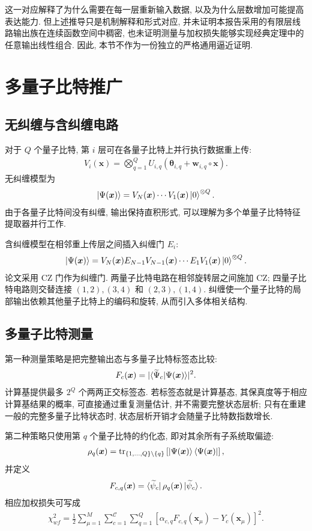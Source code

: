 \documentclass[a4paper]{ctexart}
\begin{document}
这一对应解释了为什么需要在每一层重新输入数据, 以及为什么层数增加可能提高表达能力. 但上述推导只是机制解释和形式对应, 并未证明本报告采用的有限层线路输出族在连续函数空间中稠密, 也未证明测量与加权损失能够实现经典定理中的任意输出线性组合. 因此, 本节不作为一份独立的严格通用逼近证明.

\section{多量子比特推广}

\subsection{无纠缠与含纠缠电路}

对于 $Q$ 个量子比特, 第 $i$ 层可在各量子比特上并行执行数据重上传:
\begin{align}
    V_i(\bm{x})=\bigotimes_{q=1}^Q U_{i, q}(\bm{\theta}_{i, q}+\bm{w}_{i, q}\circ\bm{x}).
\end{align}
无纠缠模型为
\begin{align}
    \ket{\Psi(\bm{x})}=V_N(\bm{x})\cdots V_1(\bm{x})\ket{0}^{\otimes Q}.
\end{align}
由于各量子比特间没有纠缠, 输出保持直积形式, 可以理解为多个单量子比特特征提取器并行工作.

含纠缠模型在相邻重上传层之间插入纠缠门 $E_i$:
\begin{align}
    \ket{\Psi(\bm{x})}=V_N(\bm{x})E_{N-1}V_{N-1}(\bm{x})\cdots E_1 V_1(\bm{x})\ket{0}^{\otimes Q}.
\end{align}
论文采用 CZ 门作为纠缠门. 两量子比特电路在相邻旋转层之间施加 CZ; 四量子比特电路则交替连接 $(1, 2),(3, 4)$ 和 $(2, 3),(1, 4)$. 纠缠使一个量子比特的局部输出依赖其他量子比特上的编码和旋转, 从而引入多体相关结构.

\subsection{多量子比特测量}

第一种测量策略是把完整输出态与多量子比特标签态比较:
\begin{align}
    F_c(\bm{x})=\lvert\braket{\widetilde{\Psi}_c|\Psi(\bm{x})}\rvert^2.
\end{align}
计算基提供最多 $2^Q$ 个两两正交标签态. 若标签态就是计算基态, 其保真度等于相应计算基结果的概率, 可直接通过重复测量估计, 并不需要完整状态层析; 只有在重建一般的完整多量子比特状态时, 状态层析开销才会随量子比特数指数增长.

第二种策略只使用第 $q$ 个量子比特的约化态, 即对其余所有子系统取偏迹:
\begin{align}
    \rho_q(\bm{x})=\operatorname{tr}_{\{1, \ldots, Q\}\setminus\{q\}}\left[\ket{\Psi(\bm{x})}\bra{\Psi(\bm{x})}\right],
\end{align}
并定义
\begin{align}
    F_{c,q}(\bm{x})=\bra{\widetilde{\psi}_c}\rho_q(\bm{x})\ket{\widetilde{\psi}_c}.
\end{align}
相应加权损失可写成
\begin{align}
    \chi_{wf}^2=\frac{1}{2}\sum_{\mu=1}^M\sum_{c=1}^{\mathcal C}\sum_{q=1}^Q[\alpha_{c,q}F_{c,q}(\bm{x}_\mu)-Y_c(\bm{x}_\mu)]^2.
\end{align}
\end{document}
